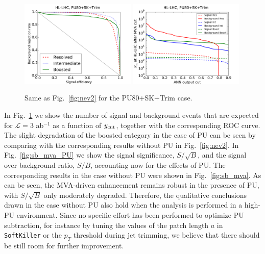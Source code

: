 \begin{figure}[t]
  \begin{center}
    \includegraphics[width=0.49\textwidth]{plots/roc_SKPU80.pdf}
\includegraphics[width=0.49\textwidth]{plots/nev2_SKPU80.pdf}
\caption{\small Same as Fig.~\ref{fig:nev2}
 for
 the PU80+SK+Trim case.
\label{fig:nev2_PU}}
\end{center}
\end{figure}

In Fig.~\ref{fig:nev2_PU}
we show the number of signal and background events that
are expected for $\mathcal{L}=3$ ab$^{-1}$
as a function of
$y_{\rm cut}$, together with the corresponding ROC curve.
%
The slight degradation of the boosted category in the case
of PU can be seen by comparing with the corresponding
results without PU in Fig.~\ref{fig:nev2}.
%
In Fig.~\ref{fig:sb_mva_PU} we show the signal significance,
$S/\sqrt{B}$, and the signal over background ratio,
$S/B$, accounting now for the effects of PU.
%
The corresponding results in the case without PU were shown in
Fig.~\ref{fig:sb_mva}.
%
As can be seen, the MVA-driven enhancement remains robust in the
presence of PU, with $S/\sqrt{B}$ only moderately degraded.
%
Therefore, the qualitative conclusions drawn
in the case without PU also hold when the analysis
is performed in a high-PU environment.
%
Since no specific effort has been performed to
optimize PU subtraction, for instance by tuning the values
of the patch length $a$ in {\tt SoftKiller}
or the $p_T$ threshold during jet trimming,
we believe that
there should be still room for further improvement.

